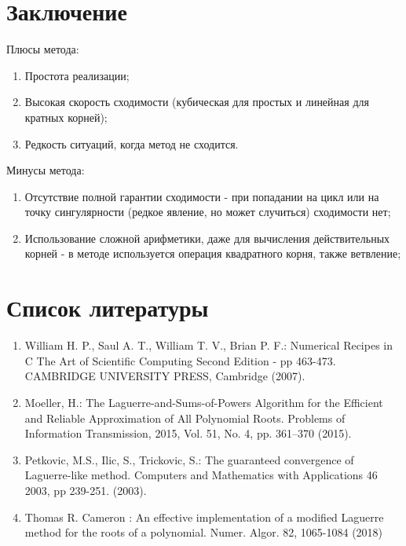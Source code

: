 \documentclass[a4paper,12pt]{article}
\begin{document}
\newpage
\section{Заключение}
Плюсы метода:
\begin{enumerate}
    \item Простота реализации;
    \item Высокая скорость сходимости (кубическая для простых и линейная для кратных корней);
    \item Редкость ситуаций, когда метод не сходится.
\end{enumerate}
Минусы метода:
\begin{enumerate}
    \item Отсутствие полной гарантии сходимости - при попадании на цикл или на точку сингулярности (редкое явление, но может случиться) сходимости нет;
    \item Использование сложной арифметики, даже для вычисления действительных корней - в методе используется операция квадратного корня, также ветвление;
\end{enumerate}
\newpage
\section{Список литературы}
\begin{enumerate}
    \item William H. P., Saul A. T., William T. V., Brian P. F.: Numerical Recipes in C The Art of Scientific Computing Second Edition - pp 463-473. CAMBRIDGE UNIVERSITY PRESS, Cambridge (2007).
    \item Moeller, H.: The Laguerre-and-Sums-of-Powers Algorithm for the Efficient and Reliable Approximation of All Polynomial Roots. Problems of Information Transmission, 2015, Vol. 51, No. 4, pp. 361–370 (2015).
    \item Petkovic, M.S., Ilic, S., Trickovic, S.: The guaranteed convergence of Laguerre-like method. Computers and Mathematics with Applications 46 2003, pp 239-251. (2003).
    \item Thomas R. Cameron : An effective implementation of a modified Laguerre
    method for the roots of a polynomial. Numer. Algor. 82, 1065-1084 (2018)
\end{enumerate}
\end{document}
